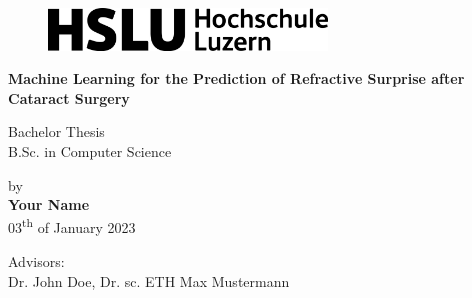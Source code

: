 \thispagestyle{empty}
\begin{figure}[ht]
    \includegraphics[width=20em,height=\textheight,keepaspectratio]{images/hslu_2022_logo.png}
\end{figure}
\vspace*{9em}

\noindent\begin{center}
\huge{\textbf{Machine Learning for the Prediction of Refractive Surprise after Cataract Surgery}}\\
\vspace*{3em}

\Large{Bachelor Thesis}\\
\Large{B.Sc. in Computer Science}\\
\vspace*{4em}

\Large{by}\\
\Large{\textbf{Your Name}}\\
\Large{03\textsuperscript{th} of January 2023}\\
\vspace*{\fill}

\large{Advisors:\\Dr. John Doe, Dr. sc. ETH Max Mustermann}
\end{center}